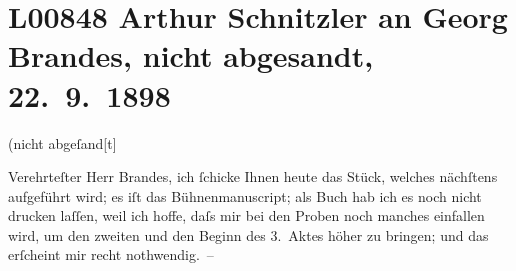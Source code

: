 

\section[Arthur Schnitzler an Georg Brandes, nicht abgesandt, 22. 9. 1898]{L00848 Arthur Schnitzler an Georg Brandes, nicht abgesandt,
               22. 9. 1898}
\nopagebreak{}
\rehead{ }\normalsize\beginnumbering{}
\toendnotes[C]{\smallbreak\pagebreak[2]}
\toendnotes[C]{\smallbreak}
\pstart
            (nicht abgeſand{[}t{]}\pend
           
\pstart{}{\pb}Verehrteſter Herr Brandes,\pend\vspace{0.5em}
\pstart
           ich ſchicke Ihnen heute das Stück, welches nächſtens aufgeführt wird; es iſt das Bühnenmanuscript; als
               Buch hab ich es noch nicht drucken laſſen, weil ich hoffe, daſs mir bei den Proben
               noch manches einfallen wird, um den zweiten und den Beginn des 3. Aktes höher zu
               bringen; und das erſcheint mir recht nothwendig. –\pend
           
